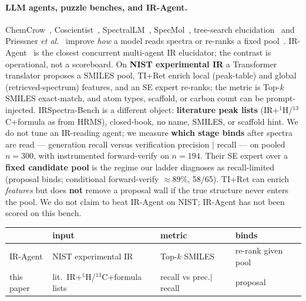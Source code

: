 \documentclass{article}
\begin{document}
\paragraph{LLM agents, puzzle benches, and IR-Agent.}
ChemCrow~\citep{mbran2024chemcrow}, Coscientist~\citep{boiko2023coscientist},
SpectralLM~\citep{su2025spectrallm}, SpecMol~\citep{shen2025specmol}, tree-search
elucidation~\citep{zhuang2025treesearch} and Priessner
\textit{et al.}~\citep{priessner2026reasoning} improve \emph{how} a model reads spectra or
re-ranks a fixed pool~\citep{zhuang2025treesearch}.
IR-Agent~\citep{noh2025iragent} is the closest concurrent multi-agent IR elucidator; the
contrast is operational, not a scoreboard.
On \textbf{NIST experimental IR} a Transformer translator proposes a SMILES pool, TI+Ret
enrich local (peak-table) and global (retrieved-spectrum) features, and an SE expert
re-ranks; the metric is Top-$k$ SMILES exact-match, and atom types, scaffold, or carbon
count can be prompt-injected.
IRSpectra-Bench is a different object: \textbf{literature peak lists}
(IR+$^1$H/$^{13}$C+formula as from HRMS), closed-book, no name, SMILES, or scaffold hint.
We do not tune an IR-reading agent; we measure \textbf{which stage binds} after spectra are
read --- generation recall versus verification precision $|$ recall --- on pooled $n{=}300$,
with instrumented forward-verify on $n{=}194$.
Their SE expert over a \textbf{fixed candidate pool} is the regime our ladder diagnoses as
recall-limited (proposal binds; conditional forward-verify $\approx$89\%, 58/65).
TI+Ret can enrich \emph{features} but does \textbf{not} remove a proposal wall if the true
structure never enters the pool.
We do not claim to beat IR-Agent on NIST; IR-Agent has not been scored on this bench.
\begin{center}
\scriptsize
\setlength{\tabcolsep}{4pt}
\begin{tabular}{@{}llll@{}}
\toprule
 & input & metric & binds \\
\midrule
IR-Agent & NIST experimental IR & Top-$k$ SMILES & re-rank given pool \\
this paper & lit.\ IR+$^1$H/$^{13}$C+formula lists & recall vs prec.$|$recall & proposal \\
\bottomrule
\end{tabular}
\end{center}
\end{document}

